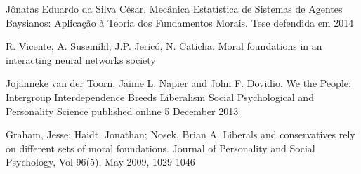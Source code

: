 \documentclass[11pt]{article}
\begin{document}
\begin{thebibliography}{99}
Jônatas Eduardo da Silva César. Mecânica Estatística de Sistemas de Agentes
Baysianos: Aplicação à Teoria dos Fundamentos Morais. Tese defendida em 2014

 R. Vicente, A. Susemihl, J.P. Jericó, N. Caticha. Moral
    foundations in an interacting neural networks society

Jojanneke van der Toorn, Jaime L. Napier and John F. Dovidio. We the People: Intergroup Interdependence Breeds Liberalism
Social Psychological and Personality Science published online 5 December 2013

 Graham, Jesse; Haidt, Jonathan; Nosek, Brian A.
    Liberals and conservatives rely on different sets of moral foundations.
Journal of Personality and Social Psychology, Vol 96(5), May 2009, 1029-1046

\end{thebibliography}    
\end{document}
